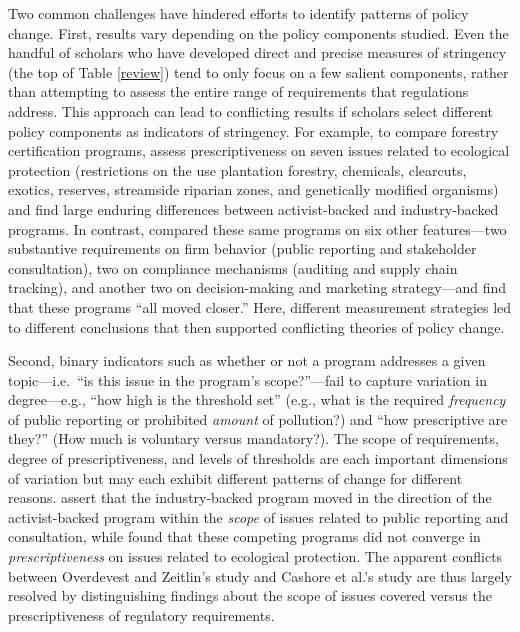 \documentclass[
      12pt,
            Review ]{article}
\begin{document}
Two common challenges have hindered efforts to identify patterns of policy change. First, results vary depending on the policy components studied. Even the handful of scholars who have developed direct and precise measures of stringency (the top of Table \ref{review}) tend to only focus on a few salient components, rather than attempting to assess the entire range of requirements that regulations address. This approach can lead to conflicting results if scholars select different policy components as indicators of stringency. For example, to compare forestry certification programs, \citet{Cashore2004} assess prescriptiveness on seven issues related to ecological protection (restrictions on the use plantation forestry, chemicals, clearcuts, exotics, reserves, streamside riparian zones, and genetically modified organisms) and find large enduring differences between activist-backed and industry-backed programs. In contrast, \citet{Overdevest2014} compared these same programs on six other features---two substantive requirements on firm behavior (public reporting and stakeholder consultation), two on compliance mechanisms (auditing and supply chain tracking), and another two on decision-making and marketing strategy---and find that these programs ``all moved closer.'' Here, different measurement strategies led to different conclusions that then supported conflicting theories of policy change.

Second, binary indicators such as whether or not a program addresses a given topic---i.e.~``is this issue in the program's scope?''---fail to capture variation in degree---e.g., ``how high is the threshold set'' (e.g., what is the required \emph{frequency} of public reporting or prohibited \emph{amount} of pollution?) and ``how prescriptive are they?'' (How much is voluntary versus mandatory?). The scope of requirements, degree of prescriptiveness, and levels of thresholds are each important dimensions of variation but may each exhibit different patterns of change for different reasons. \citet{Overdevest2014} assert that the industry-backed program moved in the direction of the activist-backed program within the \emph{scope} of issues related to public reporting and consultation, while \citet{Cashore2004} found that these competing programs did not converge in \emph{prescriptiveness} on issues related to ecological protection. The apparent conflicts between Overdevest and Zeitlin's study and Cashore et al.'s study are thus largely resolved by distinguishing findings about the scope of issues covered versus the prescriptiveness of regulatory requirements.
\end{document}
